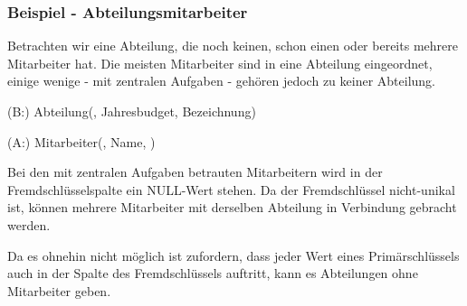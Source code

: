         \subsubsection{Beispiel - Abteilungsmitarbeiter}
          Betrachten wir eine Abteilung, die noch keinen, schon einen oder bereits mehrere Mitarbeiter hat. Die meisten Mitarbeiter sind in eine Abteilung eingeordnet, einige wenige - mit zentralen Aufgaben - geh\"oren jedoch zu keiner Abteilung.
          \begin{center}
          \end{center}
          \begin{small}
            (B:) Abteilung(, Jahresbudget, Bezeichnung)

            (A:) Mitarbeiter(, Name, )
          \end{small}

          Bei den mit zentralen Aufgaben betrauten Mitarbeitern wird in der Fremdschl\"usselspalte  ein NULL-Wert stehen. Da der Fremdschl\"ussel nicht-unikal ist, k\"onnen mehrere Mitarbeiter mit derselben Abteilung in Verbindung gebracht werden.

          Da es ohnehin nicht m\"oglich ist zufordern, dass jeder Wert eines Prim\"arschl\"ussels auch in der Spalte des Fremdschl\"ussels  auftritt, kann es Abteilungen ohne Mitarbeiter geben.
